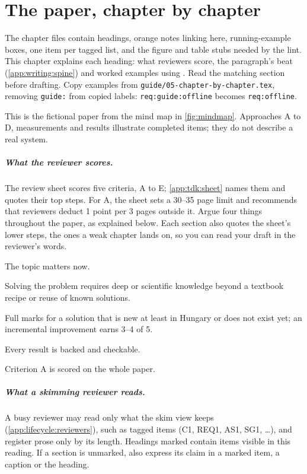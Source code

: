 \chapter{The paper, chapter by chapter}\label{app:chapters}
The chapter files contain headings, orange notes linking here, running-example boxes, one item per tagged list, and the figure and table stubs needed by the lint. This chapter explains each heading: what reviewers score, the paragraph's beat (\cref{app:writing:spine}) and worked examples using \exname. Read the matching section before drafting. Copy examples from \texttt{guide/05-chapter-by-chapter.tex}, removing \texttt{guide:} from copied labels: \texttt{req:guide:offline} becomes \texttt{req:offline}.

This is the fictional paper from the mind map in \cref{fig:mindmap}. Approaches A to D, measurements and results illustrate completed items; they do not describe a real system.

\paragraph{What the reviewer scores.} The review sheet scores five criteria, A to E; \cref{app:tdk:sheet} names them and quotes their top steps. For A, the sheet sets a 30--35 page limit and recommends that reviewers deduct 1 point per 3 pages outside it. Argue four things throughout the paper, as explained below. Each section also quotes the sheet's lower steps, the ones a weak chapter lands on, so you can read your draft in the reviewer's words.
\begin{description}[noitemsep]
  \item[Relevance (C)] The topic matters now.
  \item[Non-triviality (C and D/1)] Solving the problem requires deep or scientific knowledge beyond a textbook recipe or reuse of known solutions.
  \item[Novelty (D/1)] Full marks for a solution that is new at least in Hungary or does not exist yet; an incremental improvement earns 3--4 of 5.
  \item[Correctness (D/2)] Every result is backed and checkable.
\end{description}
Criterion A is scored on the whole paper.

\paragraph{What a skimming reviewer reads.} A busy reviewer may read only what the skim view keeps (\cref{app:lifecycle:reviewers}), such as tagged items (C1, REQ1, AS1, SG1, \dots), and register prose only by its length. Headings marked \skimmark{} contain items visible in this reading. If a section is unmarked, also express its claim in a marked item, a caption or the heading.

